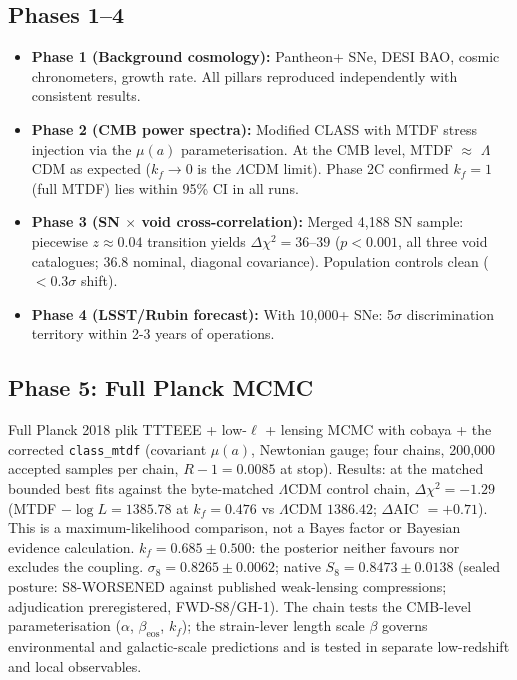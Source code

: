 \documentclass[11pt,a4paper]{article}
\begin{document}
\subsection{Phases 1--4}
\begin{itemize}
  \item \textbf{Phase 1 (Background cosmology):} Pantheon+ SNe, DESI BAO, cosmic chronometers, growth rate. All pillars reproduced independently with consistent results.
  \item \textbf{Phase 2 (CMB power spectra):} Modified CLASS with MTDF stress injection via the $\mu(a)$ parameterisation. At the CMB level, MTDF $\approx$ $\Lambda$CDM as expected ($k_f \to 0$ is the $\Lambda$CDM limit). Phase 2C confirmed $k_f = 1$ (full MTDF) lies within 95\% CI in all runs.
  \item \textbf{Phase 3 (SN $\times$ void cross-correlation):} Merged 4,188 SN sample: piecewise $z \approx 0.04$ transition yields $\Delta\chi^2 = 36$--$39$ ($p < 0.001$, all three void catalogues; 36.8 nominal, diagonal covariance). Population controls clean ($< 0.3\sigma$ shift).
  \item \textbf{Phase 4 (LSST/\allowbreak{}Rubin forecast):} With 10,000+ SNe: 5$\sigma$ discrimination territory within 2-3 years of operations.
\end{itemize}

\subsection{Phase 5: Full Planck MCMC}
Full Planck 2018 plik TTTEEE + low-$\ell$ + lensing MCMC with cobaya + the corrected \texttt{class\_\allowbreak{}mtdf} (covariant $\mu(a)$, Newtonian gauge; four chains, 200,000 accepted samples per chain, $R-1 = 0.0085$ at stop). Results: at the matched bounded best fits against the byte-matched $\Lambda$CDM control chain, $\Delta\chi^2 = -1.29$ (MTDF $-\log L = 1385.78$ at $k_f = 0.476$ vs $\Lambda$CDM $1386.42$; $\Delta$AIC $= +0.71$). This is a maximum-likelihood comparison, not a Bayes factor or Bayesian evidence calculation. $k_f = 0.685 \pm 0.500$: the posterior neither favours nor excludes the coupling. $\sigma_8 = 0.8265 \pm 0.0062$; native $S_8 = 0.8473 \pm 0.0138$ (sealed posture: S8-WORSENED against published weak-lensing compressions; adjudication preregistered, FWD-S8/\allowbreak{}GH-1). The chain tests the CMB-level parameterisation ($\alpha$, $\beta_\text{eos}$, $k_f$); the strain-lever length scale $\beta$ governs environmental and galactic-scale predictions and is tested in separate low-redshift and local observables.
\end{document}
